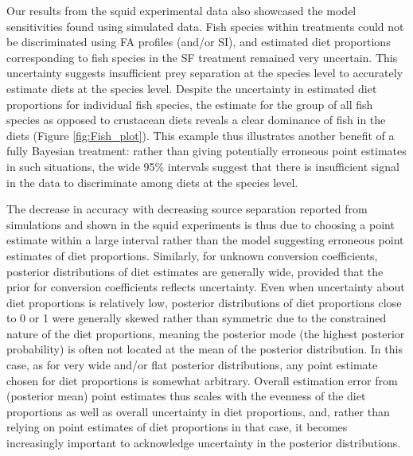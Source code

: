 \documentclass[fleqn,10pt]{wlpeerj}
\begin{document}
Our results from the squid experimental data also showcased the model
sensitivities found using simulated data. Fish species within treatments could
not be discriminated using FA profiles (and/or SI), and estimated diet
proportions corresponding to fish species in the SF treatment remained
very uncertain. This uncertainty suggests insufficient prey
separation at the species level to accurately estimate diets at the
species level. Despite the uncertainty in estimated diet proportions for
individual fish species, the estimate for the group of all
fish species as opposed to crustacean diets reveals a clear dominance of
fish in the diets (Figure \ref{fig:Fish_plot}). This example thus illustrates another
benefit of a fully Bayesian treatment: rather than giving
potentially erroneous point estimates in such situations, the wide
95\% intervals suggest that there is insufficient signal in the
data to discriminate among diets at the species level. 

The decrease in accuracy with decreasing source separation reported from simulations and shown in the
squid experiments is thus due to choosing a point estimate within a
large interval rather
than the model suggesting erroneous point estimates of diet proportions. Similarly, for unknown conversion coefficients, posterior
distributions of diet estimates are generally wide, provided that the
prior for conversion coefficients reflects uncertainty. Even when
uncertainty about diet proportions is relatively low, posterior distributions of diet proportions close to 0 or
1 were generally skewed rather than symmetric due to the constrained nature of the diet
proportions, meaning the posterior
mode (the highest posterior probability) is often not located at the
mean of the posterior distribution. In this case, as for very wide and/or flat
posterior distributions, any point estimate
chosen for diet proportions is somewhat arbitrary. Overall estimation error from (posterior mean) point
estimates thus scales with the evenness of the diet proportions as
well as overall uncertainty in diet proportions, and,
rather than relying on point estimates of diet proportions in that case,
it becomes increasingly important to acknowledge uncertainty in the
posterior distributions.
\end{document}
